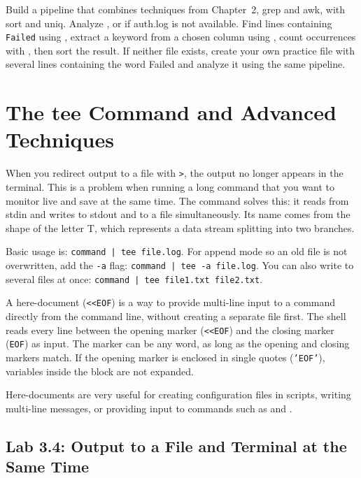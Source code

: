 \begin{challengebox}
Build a pipeline that combines techniques from Chapter~2, grep and awk, with sort and uniq. Analyze , or  if auth.log is not available. Find lines containing \texttt{Failed} using , extract a keyword from a chosen column using , count occurrences with , then sort the result. If neither file exists, create your own practice file with several lines containing the word Failed and analyze it using the same pipeline.
\end{challengebox}

\section{The tee Command and Advanced Techniques}
\label{sec:tee-advanced}

When you redirect output to a file with \texttt{>}, the output no longer appears in the terminal. This is a problem when running a long command that you want to monitor live and save at the same time. The  command solves this: it reads from stdin and writes to stdout and to a file simultaneously. Its name comes from the shape of the letter T, which represents a data stream splitting into two branches.

Basic usage is: \texttt{command | tee file.log}. For append mode so an old file is not overwritten, add the \texttt{-a} flag: \texttt{command | tee -a file.log}. You can also write to several files at once: \texttt{command | tee file1.txt file2.txt}.

A here-document (\texttt{<<EOF}) is a way to provide multi-line input to a command directly from the command line, without creating a separate file first. The shell reads every line between the opening marker (\texttt{<<EOF}) and the closing marker (\texttt{EOF}) as input. The marker can be any word, as long as the opening and closing markers match. If the opening marker is enclosed in single quotes (\texttt{'EOF'}), variables inside the block are not expanded.

Here-documents are very useful for creating configuration files in scripts, writing multi-line messages, or providing input to commands such as  and .

\subsection*{Lab 3.4: Output to a File and Terminal at the Same Time}

